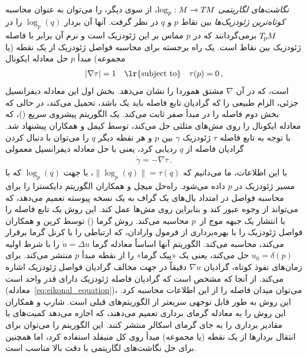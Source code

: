 \emph{نگاشت‌های لگاریتمی} $\log_p: M \to T\mkern-1.5muM$، از سوی دیگر، را می‌توان به عنوان محاسبه \emph{کوتاه‌ترین ژئودزیک‌ها} بین نقاط $p$ و $q$ در نظر گرفت.
آنها آن بردار $\log_p(q)$ را در $T_{\mkern-1.5mu p}\mkern-.5muM$ برمی‌گردانند که در $p$ مماس بر این ژئودزیک است و نرم آن برابر با فاصله ژئودزیک بین نقاط است.
یک راه برجسته برای محاسبه فواصل ژئودزیک از یک نقطه (یا مجموعه) مبدأ $p$ حل معادله ایکونال
\begin{align}\label{eq:eikonal_equation}
    |\nabla \tau| = 1
    \quad\textup{\lr{subject to}}\quad
    \tau(p) = 0 \,,
\end{align}
است، که در آن $\nabla$ مشتق هموردا را نشان می‌دهد.
بخش اول این معادله دیفرانسیل جزئی، الزام طبیعی را که گرادیان تابع فاصله باید یک باشد، تحمیل می‌کند، در حالی که بخش دوم فاصله را در مبدأ صفر ثابت می‌کند.
یک الگوریتم پیشروی سریع ()، که معادله ایکونال را روی مش‌های مثلثی حل می‌کند، توسط کیمل و همکاران\cite{kimmel1998computingGeodesics} پیشنهاد شد.
با توجه به تابع فاصله $\tau$ ژئودزیک $\gamma$ بین $p$ و هر نقطه دیگر $q$ را می‌توان با دنبال کردن گرادیان فاصله از $q$ ردیابی کرد، یعنی با حل معادله دیفرانسیل معمولی
\begin{align}
    \dot{\gamma} = -\nabla \tau \,.
\end{align}
با این اطلاعات، ما می‌دانیم که $\lVert\log_p(q)\rVert = \tau(q)$، با جهت $\log_p(q)$ که با مسیر ژئودزیک در $p$ داده می‌شود.
راه‌حل میچل و همکاران\cite{mitchell1987discrete} الگوریتم دایکسترا را برای محاسبه فواصل در امتداد یال‌های یک گراف به یک نسخه پیوسته تعمیم می‌دهد، که می‌تواند از وجوه عبور کند و بنابراین روی مش‌ها عمل کند.
این روش یک تابع فاصله را با انتشار یک جبهه موج از~$p$ محاسبه می‌کند.
روش گرما () توسط  کرین و همکاران\cite{Crane2017HeatMethodDistance} فواصل ژئودزیک را با بهره‌برداری از فرمول وارادان، که ارتباطی را با کرنل گرما برقرار می‌کند، محاسبه می‌کند.
الگوریتم آنها اساساً معادله گرما $\dot{u} = \Delta u$ را با شرط اولیه $u_0 = \delta(p)$ حل می‌کند، یعنی یک «پیک گرما» را از نقطه مبدأ $p$ منتشر می‌کند.
برای زمان‌های نفوذ کوتاه، گرادیان $\nabla u$ دقیقاً در جهت مخالف گرادیان فواصل ژئودزیک اشاره می‌کند.
از آنجا که مشخص است که گرادیان فاصله ژئودزیک دارای قدر واحد است (معادله~\eqref{eq:eikonal_equation})، می‌توان میدان فاصله را از این اطلاعات محاسبه کرد.
این روش به طور قابل توجهی سریعتر از الگوریتم‌های قبلی است.
شارپ و همکاران\cite{Sharp2019VectorHeatMethod} این روش را به معادله گرمای برداری تعمیم می‌دهند، که اجازه می‌دهد کمیت‌های با مقادیر برداری را به جای گرمای اسکالر منتشر کنند.
این الگوریتم را می‌توان برای انتقال بردارها از یک نقطه (یا مجموعه) مبدأ روی کل منیفلد استفاده کرد، اما همچنین برای حل نگاشت‌های لگاریتمی با دقت بالا مناسب است.